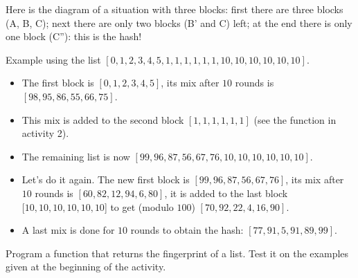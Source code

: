 \documentclass[11pt,class=report,crop=false]{standalone}
\begin{document}
\begin{activite}
\begin{enumerate}
 
Here is the diagram of a situation with three blocks: first there are three blocks (A, B, C); next there are only two blocks (B' and C) left; at the end there is only one block (C''): this is the hash!
  
  
  Example using the list $[0,1,2,3,4,5,1,1,1,1,1,1,10,10,10,10,10,10]$.
  \begin{itemize}
    \item The first block is $[0,1,2,3,4,5]$, its mix after $10$ rounds is    $[98, 95, 86, 55, 66, 75]$. 
    \item This mix is added to the second block $[1,1,1,1,1,1]$ (see the  function in activity 2).
    \item The remaining list is now $[99,96,87,56,67,76,10,10,10,10,10,10]$.
    \item Let's do it again. The new first block is $[99,96,87,56,67,76]$, its mix after $10$ rounds is $[60, 82, 12, 94, 6, 80]$, it is added to the last block $[10,10,10,10,10,10$] to get (modulo $100$) $[70,92,22,4,16,90]$.
    \item A last mix is done for $10$ rounds to obtain the hash: $[77, 91, 5, 91, 89, 99]$.
   \end{itemize}
   
   Program a  function that returns the fingerprint of a list. Test it on the examples given at the beginning of the activity.
\end{enumerate}   
     
\end{activite}



\end{document}
